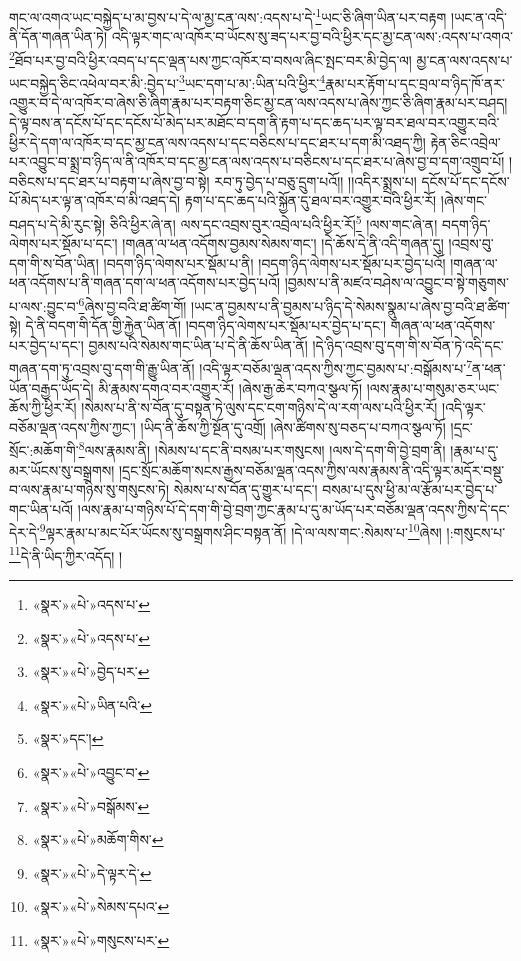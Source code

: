 གང་ལ་འགའ་ཡང་བསྐྱེད་པ་མ་བྱས་པ་དེ་ལ་མྱ་ངན་ལས་:འདས་པ་དེ་\footnote{«སྣར་»«པེ་»འདས་པ་}ཡང་ཅི་ཞིག་ཡིན་པར་བརྟག །ཡང་ན་འདི་ནི་དོན་གཞན་ཡིན་ཏེ། འདི་ལྟར་གང་ལ་འཁོར་བ་ཡོངས་སུ་ཟད་པར་བྱ་བའི་ཕྱིར་དང་མྱ་ངན་ལས་:འདས་པ་འགའ་\footnote{«སྣར་»«པེ་»འདས་པ་}ཐོབ་པར་བྱ་བའི་ཕྱིར་འབད་པ་དང་ལྡན་པས་ཀྱང་འཁོར་བ་བསལ་ཞིང་སྤང་བར་མི་བྱེད་ལ། མྱ་ངན་ལས་འདས་པ་ཡང་བསྐྱེད་ཅིང་འཕེལ་བར་མི་:བྱེད་པ་\footnote{«སྣར་»«པེ་»བྱེད་པར་}ཡང་དག་པ་མ་:ཡིན་པའི་ཕྱིར་\footnote{«སྣར་»«པེ་»ཡིན་པའི་}རྣམ་པར་རྟོག་པ་དང་བྲལ་བ་ཉིད་ཁོ་ནར་འགྱུར་བ་དེ་ལ་འཁོར་བ་ཞེས་ཅི་ཞིག་རྣམ་པར་བརྟག་ཅིང་མྱ་ངན་ལས་འདས་པ་ཞེས་ཀྱང་ཅི་ཞིག་རྣམ་པར་བཤད། དེ་ལྟ་བས་ན་དངོས་པོ་དང་དངོས་པོ་མེད་པར་མཐོང་བ་དག་ནི་རྟག་པ་དང་ཆད་པར་ལྟ་བར་ཐལ་བར་འགྱུར་བའི་ཕྱིར་དེ་དག་ལ་འཁོར་བ་དང་མྱ་ངན་ལས་འདས་པ་དང་བཅིངས་པ་དང་ཐར་པ་དག་མི་འཐད་ཀྱི། རྟེན་ཅིང་འབྲེལ་པར་འབྱུང་བ་སྨྲ་བ་ཉིད་ལ་ནི་འཁོར་བ་དང་མྱ་ངན་ལས་འདས་པ་བཅིངས་པ་དང་ཐར་པ་ཞེས་བྱ་བ་དག་འགྲུབ་པོ། །བཅིངས་པ་དང་ཐར་པ་བརྟག་པ་ཞེས་བྱ་བ་སྟེ། རབ་ཏུ་བྱེད་པ་བཅུ་དྲུག་པའོ།། །།འདིར་སྨྲས་པ། དངོས་པོ་དང་དངོས་པོ་མེད་པར་ལྟ་ན་འཁོར་བ་མི་འཐད་དེ། རྟག་པ་དང་ཆད་པའི་སྐྱོན་དུ་ཐལ་བར་འགྱུར་བའི་ཕྱིར་རོ། །ཞེས་གང་བཤད་པ་དེ་མི་རུང་སྟེ། ཅིའི་ཕྱིར་ཞེ་ན། ལས་དང་འབྲས་བུར་འབྲེལ་པའི་ཕྱིར་རོ།\footnote{«སྣར་»དང་།} །ལས་གང་ཞེ་ན། བདག་ཉིད་ལེགས་པར་སྡོམ་པ་དང་། །གཞན་ལ་ཕན་འདོགས་བྱམས་སེམས་གང་། །དེ་ཆོས་དེ་ནི་འདི་གཞན་དུ། །འབྲས་བུ་དག་གི་ས་བོན་ཡིན། །བདག་ཉིད་ལེགས་པར་སྡོམ་པ་ནི། །བདག་ཉིད་ལེགས་པར་སྡོམ་པར་བྱེད་པའོ། །གཞན་ལ་ཕན་འདོགས་པ་ནི་གཞན་དག་ལ་ཕན་འདོགས་པར་བྱེད་པའོ། །བྱམས་པ་ནི་མཛའ་བཤེས་ལ་འབྱུང་བ་སྟེ་གཅུགས་པ་ལས་:བྱུང་བ་\footnote{«སྣར་»«པེ་»འབྱུང་བ་}ཞེས་བྱ་བའི་ཐ་ཚིག་གོ། །ཡང་ན་བྱམས་པ་ནི་བྱམས་པ་ཉིད་དེ་སེམས་སྣུམ་པ་ཞེས་བྱ་བའི་ཐ་ཚིག་སྟེ། དེ་ནི་བདག་གི་དོན་གྱི་རྐྱེན་ཡིན་ནོ། །བདག་ཉིད་ལེགས་པར་སྡོམ་པར་བྱེད་པ་དང་། གཞན་ལ་ཕན་འདོགས་པར་བྱེད་པ་དང་། བྱམས་པའི་སེམས་གང་ཡིན་པ་དེ་ནི་ཆོས་ཡིན་ནོ། །དེ་ཉིད་འབྲས་བུ་དག་གི་ས་བོན་ཏེ་འདི་དང་གཞན་དག་ཏུ་འབྲས་བུ་དག་གི་རྒྱུ་ཡིན་ནོ། །འདི་ལྟར་བཅོམ་ལྡན་འདས་ཀྱིས་ཀྱང་བྱམས་པ་:བསྒོམས་པ་\footnote{«སྣར་»«པེ་»བསྒོམས་}ན་ཕན་ཡོན་བརྒྱད་ཡོད་དེ། མི་རྣམས་དགའ་བར་འགྱུར་རོ། །ཞེས་རྒྱ་ཆེར་བཀའ་སྩལ་ཏོ། །ལས་རྣམ་པ་གསུམ་ཅར་ཡང་ཆོས་ཀྱི་ཕྱིར་རོ། །སེམས་པ་ནི་ས་བོན་དུ་བསྟན་ཏེ་ལུས་དང་ངག་གཉིས་དེ་ལ་རག་ལས་པའི་ཕྱིར་རོ། །འདི་ལྟར་བཅོམ་ལྡན་འདས་ཀྱིས་ཀྱང་། །ཡིད་ནི་ཆོས་ཀྱི་སྔོན་དུ་འགྲོ། །ཞེས་ཚིགས་སུ་བཅད་པ་བཀའ་སྩལ་ཏོ། །དྲང་སྲོང་:མཆོག་གི་\footnote{«སྣར་»«པེ་»མཆོག་གིས་}ལས་རྣམས་ནི། །སེམས་པ་དང་ནི་བསམ་པར་གསུངས། །ལས་དེ་དག་གི་བྱེ་བྲག་ནི། །རྣམ་པ་དུ་མར་ཡོངས་སུ་བསྒྲགས། །དྲང་སྲོང་མཆོག་སངས་རྒྱས་བཅོམ་ལྡན་འདས་ཀྱིས་ལས་རྣམས་ནི་འདི་ལྟར་མདོར་བསྡུ་བ་ལས་རྣམ་པ་གཉིས་སུ་གསུངས་ཏེ། སེམས་པ་ས་བོན་དུ་གྱུར་པ་དང་། བསམ་པ་དུས་ཕྱི་མ་ལ་རྩོམ་པར་བྱེད་པ་གང་ཡིན་པའོ། །ལས་རྣམ་པ་གཉིས་པོ་དེ་དག་གི་བྱེ་བྲག་ཀྱང་རྣམ་པ་དུ་མ་ཡོད་པར་བཅོམ་ལྡན་འདས་ཀྱིས་དེ་དང་དེར་དེ་\footnote{«སྣར་»«པེ་»དེ་ལྟར་དེ་}ལྟར་རྣམ་པ་མང་པོར་ཡོངས་སུ་བསྒྲགས་ཤིང་བསྟན་ནོ། །དེ་ལ་ལས་གང་:སེམས་པ་\footnote{«སྣར་»«པེ་»སེམས་དཔའ་}ཞེས། །:གསུངས་པ་\footnote{«སྣར་»«པེ་»གསུངས་པར་}དེ་ནི་ཡིད་ཀྱིར་འདོད། །
